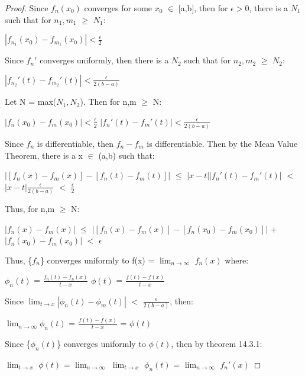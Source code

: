     \begin{proof}
        Since $f_n(x_0)$ converges for some $x_0$ $\in$ [a,b], then for
        $\epsilon > 0$, there is a $N_1$ such that for $n_1,m_1$ $\geq$ $N_1$:

        \hspace{0.5cm}
        $|f_{n_1}(x_0) - f_{m_1}(x_0)| < \frac{\epsilon}{2}$

        Since $f_n'$ converges uniformly, then there is a $N_2$ such that for
        $n_2,m_2$ $\geq$ $N_2$:

        \hspace{0.5cm}
        $|f_{n_2}'(t) - f_{m_2}'(t)| < \frac{\epsilon}{2(b-a)}$

        Let N = max($N_1,N_2$). Then for n,m $\geq$ N:

        \hspace{0.5cm}
        $|f_n(x_0) - f_m(x_0)| < \frac{\epsilon}{2}$
        \hspace{2cm}
        $|f_n'(t) - f_m'(t)| < \frac{\epsilon}{2(b-a)}$

        Since $f_n$ is differentiable, then $f_n - f_m$ is differentiable.
        Then by the Mean Value Theorem, there is a x $\in$ (a,b) such that:

        \hspace{0.5cm}
        $|[f_n(x) - f_m(x)] - [f_n(t) - f_m(t)]|$
        $\leq$ $|x-t| |f_{n}'(t) - f_{m}'(t)|$
        $<$ $|x-t| \frac{\epsilon}{2(b-a)}$
        $<$ $\frac{\epsilon}{2}$

        Thus, for n,m $\geq$ N:

        \hspace{0.5cm}
        $|f_n(x) - f_m(x)|$
        $\leq$ $|[f_n(x) - f_m(x)] - [f_n(x_0) - f_m(x_0)]|$
                + $|f_n(x_0) - f_m(x_0)|$
        $<$ $\epsilon$

        Thus, \{$f_n$\} converges uniformly to f(x)
        = $\lim_{n \rightarrow \infty}$ $f_n(x)$ where:

        \hspace{0.5cm}
        $\phi_n(t)$ = $\frac{f_n(t) - f_n(x)}{t-x}$
        \hspace{2cm}
        $\phi(t)$ = $\frac{f(t) - f(x)}{t-x}$

        Since $\lim_{t \rightarrow x} |\phi_n(t) - \phi_m(t)|$ $<$
        $\frac{\epsilon}{2(b-a)}$, then:
        
        \hspace{0.5cm}
        $\lim_{n \rightarrow \infty} \phi_n(t)$
        = $\frac{f(t) - f(x)}{t-x}$ = $\phi(t)$

        Since \{$\phi_n(t)$\} converges uniformly to $\phi(t)$, then
        by {\color{red} theorem 14.3.1}:

        \hspace{0.5cm}
        $\lim_{t \rightarrow x}$ $\phi(t)$
        = $\lim_{n \rightarrow \infty}$ $\lim_{t \rightarrow x}$ $\phi_n(t)$
        = $\lim_{n \rightarrow \infty}$ $f_n'(x)$
    \end{proof}

